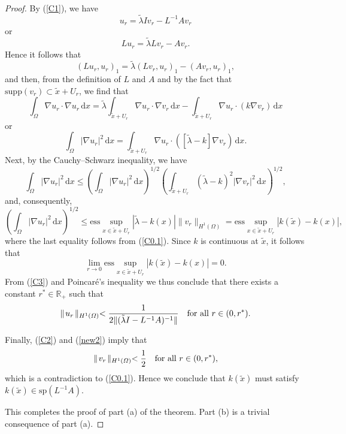 \documentclass{imanum}
\begin{document}
\begin{proof}
By (\ref{C1}), we have
\begin{equation*}
u_r = \tilde \lambda I v_r - L^{-1} A v_r
\end{equation*}
or
\begin{equation*}
L u_r = \tilde \lambda L v_r - A v_r .
\end{equation*}
Hence it follows that
\begin{equation*}
(L u_r,u_r)_1 = \tilde \lambda (L v_r,u_r)_1 - (A v_r,u_r)_1 ,
\end{equation*}
and then, from the definition of $L$ and $A$ and
by the fact that $\mathrm{supp} (v_r) \subset \tilde x + U_r$,
we find that
\begin{equation*}
\int_{\Omega} \nabla u_r \cdot \nabla u_r \, \mathrm{d}x =
\tilde \lambda \int_{\tilde x + U_r} \nabla u_r \cdot
\nabla v_r \, \mathrm{d}x -
\int_{\tilde x + U_r} \nabla u_r \cdot (k \nabla v_r) \, \mathrm{d}x
\end{equation*}
or
\begin{equation*}
\int_{\Omega} |\nabla u_{r}|^2 \, \mathrm{d}x =
\int_{\tilde x + U_r} \nabla u_r \cdot ([\tilde \lambda-k]
\nabla v_r) \, \mathrm{d}x .
\end{equation*}
Next, by the Cauchy--Schwarz inequality, we have
\begin{equation*}
\int_{\Omega} |\nabla u_{r}|^{2} \, \mathrm{d}x \leq
\left(\int_{\Omega} |\nabla u_{r}|^{2} \, \mathrm{d}x \right)^{1/2}
\left(\int_{\tilde x + U_r} (\tilde \lambda-k)^{2}
|\nabla v_{r}|^2 \, \mathrm{d}x \right)^{1/2} ,
\end{equation*}
and, consequently,
\begin{equation}
\left( \int_{\Omega} |\nabla u_r|^{2} \,
\mathrm{d}x \right)^{1/2} \leq
\mathrm{ess} \sup_{x \in \tilde x + U_r} |\tilde \lambda - k(x)|
\parallel\! v_r \!\parallel_{H^1(\Omega)}
= \mathrm{ess} \sup_{x \in \tilde x + U_r} |k(\tilde x) - k(x)| ,
\label{C3}
\end{equation}
where the last equality follows from (\ref{C0.1}).
Since $k$ is continuous at $\tilde x$, it follows that
\begin{equation*}
\lim_{r \rightarrow 0} \mathrm{ess}
\sup_{x \in \tilde x + U_r} |k(\tilde x) - k(x)| = 0.
\end{equation*}
From (\ref{C3}) and Poincar\'e's inequality we thus conclude that
there exists a constant $r^\ast \in \mathbb{R}_+$ such that
\begin{equation}
\parallel\! u_r \!\parallel_{H^1(\Omega)} <
\frac{1}{2 \| (\tilde \lambda I-L^{-1}A)^{-1} \|}
\quad \hbox{for all}\ r \in (0,r^\ast).
\label{new2}
\end{equation}

Finally, (\ref{C2}) and (\ref{new2}) imply that
\begin{equation*}
\parallel\! v_r \!\parallel_{H^1(\Omega)} < \frac{1}{2}
\quad \hbox{for all}\ r \in (0,r^\ast),
\end{equation*}
which is a contradiction to (\ref{C0.1}). Hence we conclude that
$k(\tilde x)$ must satisfy $k(\tilde x) \in \mathrm{sp}(L^{-1}A)$.

This completes the proof of part (a) of the theorem. Part (b) is a
trivial consequence of part (a).
\end{proof}
\end{document}
